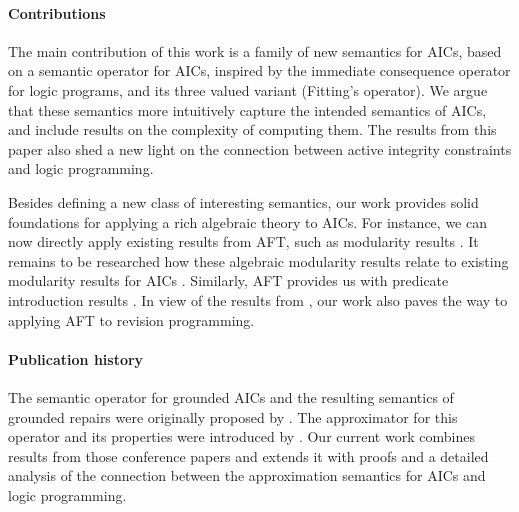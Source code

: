 
\paragraph{Contributions}
The main contribution of this work is a family of new semantics for AICs, based on a semantic operator for AICs, inspired by the immediate consequence operator for logic programs, and its three valued variant (Fitting's operator).
We argue that these semantics more intuitively capture the intended semantics of AICs, and include results on the complexity of computing them.
The results from this paper also shed a new light on the connection between active integrity constraints and logic programming. 


Besides defining a new class of interesting semantics, our work provides solid foundations for applying a rich algebraic theory to AICs. For instance, we can now directly apply existing results from AFT, such as modularity results \cite{tocl/VennekensGD06,tocl/BogaertsVD16}. It remains to be researched how these algebraic modularity results relate to existing modularity results for AICs \cite{foiks/Cruz-Filipe14,iclp/Cruz-Filipe16}. 
Similarly, AFT provides us with predicate introduction results \cite{VennekensMWD07a,VennekensMWD07b}. 
In view of the results from \citet{tplp/CaropreseT11}, our work also paves the way to applying AFT to revision programming.



\paragraph{Publication history}
The semantic operator for grounded AICs and the resulting semantics of grounded repairs were originally proposed by \citet{iclp/Cruz-Filipe16}.
The approximator for this operator and its properties were introduced by \citet{ijcai/BogaertsC17}.
Our current work combines results from those conference papers and extends it with proofs and a detailed analysis of the connection between the approximation semantics for AICs and logic programming.

